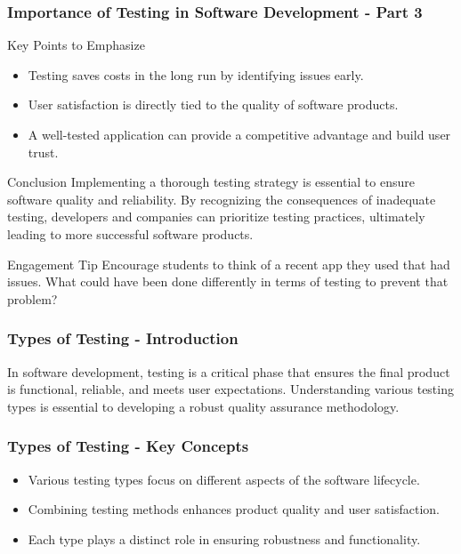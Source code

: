 \documentclass{beamer}
\begin{document}
\begin{frame}[fragile]
    \frametitle{Importance of Testing in Software Development - Part 3}
    \begin{block}{Key Points to Emphasize}
        \begin{itemize}
            \item Testing saves costs in the long run by identifying issues early.
            \item User satisfaction is directly tied to the quality of software products.
            \item A well-tested application can provide a competitive advantage and build user trust.
        \end{itemize}
    \end{block}
    
    \begin{block}{Conclusion}
        Implementing a thorough testing strategy is essential to ensure software quality and reliability. By recognizing the consequences of inadequate testing, developers and companies can prioritize testing practices, ultimately leading to more successful software products.
    \end{block}

    \begin{block}{Engagement Tip}
        Encourage students to think of a recent app they used that had issues. What could have been done differently in terms of testing to prevent that problem?
    \end{block}
\end{frame}

\begin{frame}[fragile]
    \frametitle{Types of Testing - Introduction}
    In software development, testing is a critical phase that ensures the final product is functional, reliable, and meets user expectations. 
    Understanding various testing types is essential to developing a robust quality assurance methodology.
\end{frame}

\begin{frame}[fragile]
    \frametitle{Types of Testing - Key Concepts}
    \begin{itemize}
        \item Various testing types focus on different aspects of the software lifecycle.
        \item Combining testing methods enhances product quality and user satisfaction.
        \item Each type plays a distinct role in ensuring robustness and functionality.
    \end{itemize}
\end{frame}
\end{document}
